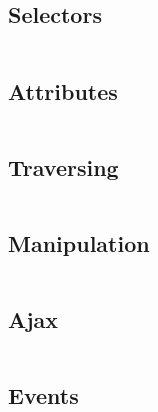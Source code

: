 \subsection{Selectors}




\begin{lstlisting}[language=bash]

\end{lstlisting}


\subsection{Attributes}


\begin{lstlisting}[language=bash]

\end{lstlisting}


\subsection{Traversing}



\begin{lstlisting}[language=bash]

\end{lstlisting}


\subsection{Manipulation}



\begin{lstlisting}[language=bash]

\end{lstlisting}


\subsection{Ajax}



\begin{lstlisting}[language=bash]

\end{lstlisting}


\subsection{Events}



